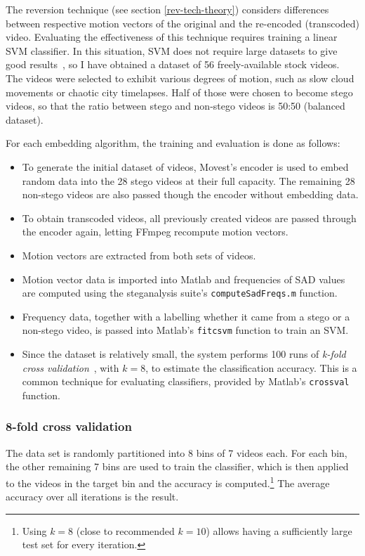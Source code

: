\documentclass[12pt,british,twoside,notitlepage,usenames,dvipsnames,hypens,final]{report}
\numberwithin{equation}{section}
\numberwithin{figure}{section}
\begin{document}
The reversion technique (see section \ref{rev-tech-theory}) considers differences between respective motion vectors of the original and the re-encoded (transcoded) video. Evaluating the effectiveness of this technique requires training a linear SVM classifier. In this situation, SVM does not require large datasets to give good results~\cite{cao2012video}, so I have obtained a dataset of 56 freely-available stock videos. The videos were selected to exhibit various degrees of motion, such as slow cloud movements or chaotic city timelapses. Half of those were chosen to become stego videos, so that the ratio between stego and non-stego videos is 50:50 (balanced dataset).

For each embedding algorithm, the training and evaluation is done as follows:
\begin{itemize}
\item To generate the initial dataset of videos, Movest's encoder is used to embed random data into the 28 stego videos at their full capacity. The remaining 28 non-stego videos are also passed though the encoder without embedding data.
\item To obtain transcoded videos, all previously created videos are passed through the encoder again, letting FFmpeg recompute motion vectors.
\item Motion vectors are extracted from both sets of videos.
\item Motion vector data is imported into Matlab and frequencies of SAD values are computed using the steganalysis suite's \texttt{computeSadFreqs.m} function.
\item Frequency data, together with a labelling whether it came from a stego or a non-stego video, is passed into Matlab's \texttt{fitcsvm} function to train an SVM.
\item Since the dataset is relatively small, the system performs 100 runs of \emph{k-fold cross validation}~\cite{ai2-notes}, with $k = 8$, to estimate the classification accuracy. This is a common technique for evaluating classifiers, provided by Matlab's \texttt{crossval} function.

\end{itemize}

\subsubsection*{8-fold cross validation} 

The data set is randomly partitioned into 8 bins of 7 videos each. For each bin, the other remaining 7 bins are used to train the classifier, which is then applied to the videos in the target bin and the accuracy is computed.\footnote{Using $k = 8$ (close to recommended $k = 10$) allows having a sufficiently large test set for every iteration.} The average accuracy over all iterations is the result.
\end{document}
